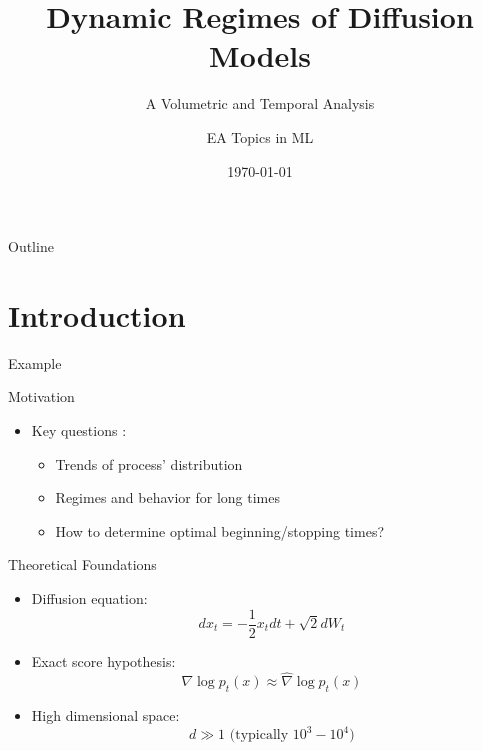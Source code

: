 \documentclass[aspectratio=169]{beamer}
\title{Dynamic Regimes of Diffusion Models}
\subtitle{A Volumetric and Temporal Analysis}
\author{EA Topics in ML}
\institute{Ecole Polytechnique}
\date{\today}
\begin{document}
\begin{frame}
    \titlepage
\end{frame}

\begin{frame}{Outline}
    \tableofcontents
\end{frame}



\section{Introduction}


\begin{frame}{Example}
    \begin{center}
    \end{center}
\end{frame}


\begin{frame}{Motivation}
    \begin{itemize}
        \item Key questions :
        \begin{itemize}
            \item Trends of process' distribution
            \item Regimes and behavior for long times
            \item How to determine optimal beginning/stopping times?
        \end{itemize}
    \end{itemize}
\end{frame}


\begin{frame}{Theoretical Foundations}
    \begin{itemize}
        \item Diffusion equation:
        \begin{equation}
            dx_t = -\frac{1}{2} x_t dt + \sqrt{2} dW_t
        \end{equation}
        
        \item Exact score hypothesis:
        \begin{equation}
            \nabla \log p_t(x) \approx \hat{\nabla} \log p_t(x)
        \end{equation}
        
        \item High dimensional space:
        \begin{equation}
            d \gg 1 \text{ (typically } 10^3-10^4\text{)}
        \end{equation}
    \end{itemize}
\end{frame}
\end{document}
